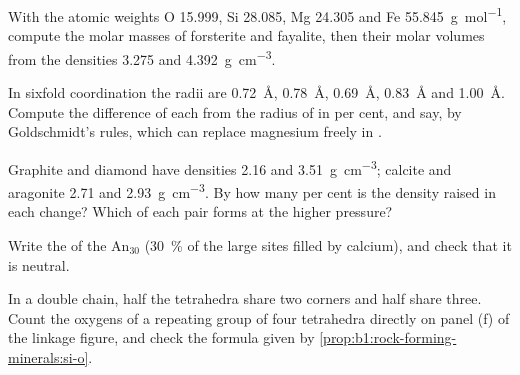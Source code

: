 \begin{exercise}[$\star$]\label{exo:b1:rock-forming-minerals:2}
With the atomic weights O \num{15.999}, Si \num{28.085}, Mg \num{24.305} and
Fe \qty{55.845}{g.mol^{-1}}, compute the molar masses of forsterite and
fayalite, then their molar volumes from the densities \num{3.275} and
\qty{4.392}{g.cm^{-3}}.
\end{exercise}

\begin{exercise}[$\star$]\label{exo:b1:rock-forming-minerals:3}
In sixfold coordination the radii are  \qty{0.72}{\angstrom},
 \qty{0.78}{\angstrom},  \qty{0.69}{\angstrom},
 \qty{0.83}{\angstrom} and  \qty{1.00}{\angstrom}.
Compute the difference of each from the radius of  in per cent,
and say, by Goldschmidt's rules, which can replace magnesium freely in
.
\end{exercise}

\begin{exercise}[$\star$]\label{exo:b1:rock-forming-minerals:4}
Graphite and diamond have densities \num{2.16} and \qty{3.51}{g.cm^{-3}};
calcite and aragonite \num{2.71} and \qty{2.93}{g.cm^{-3}}. By how many per
cent is the density raised in each change? Which  of each pair forms
at the higher pressure?
\end{exercise}

\begin{exercise}[$\star\star$]\label{exo:b1:rock-forming-minerals:5}
Write the  of the  $\text{An}_{30}$ (\qty{30}{\percent}
of the large sites filled by calcium), and check that it is neutral.
\end{exercise}

\begin{exercise}[$\star\star$]\label{exo:b1:rock-forming-minerals:6}
In a double chain, half the tetrahedra share two corners and half share
three. Count the oxygens of a repeating group of four tetrahedra directly on
panel (f) of the linkage figure, and check the formula  given by
\cref{prop:b1:rock-forming-minerals:si-o}.
\end{exercise}

